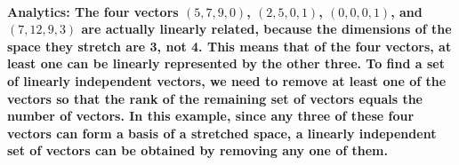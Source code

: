 \documentclass[11pt]{article} %
\begin{document}
\paragraph{\textbf{Analytics:} The four vectors $(5,7,9,0)$, $(2,5,0,1)$, $(0,0,0,1)$, and $(7,12,9,3)$ are actually linearly related, because the dimensions of the space they stretch are 3, not 4. This means that of the four vectors, at least one can be linearly represented by the other three. To find a set of linearly independent vectors, we need to remove at least one of the vectors so that the rank of the remaining set of vectors equals the number of vectors. In this example, since any three of these four vectors can form a basis of a stretched space, a linearly independent set of vectors can be obtained by removing any one of them.}
% 
% 
\end{document}

